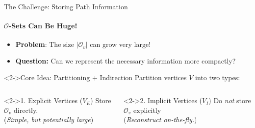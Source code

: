 \begin{frame}{The Challenge: Storing Path Information}
    \framesubtitle{$\mathcal{O}$-Sets Can Be Huge!}

    \begin{itemize}
        \item \textbf{Problem}: The size $|\mathcal{O}_v|$ can grow very large!
        \item \textbf{Question:} Can we represent the necessary information more compactly?
    \end{itemize}


    \begin{alertblock}<2->{Core Idea: Partitioning + Indirection}
        Partition vertices $V$ into two types:
    \end{alertblock}
    \vspace{-1em}
    \begin{columns}[T] %
        \begin{column}{0.48\textwidth}
            \begin{block}<2->{1. Explicit Vertices ($V_E$)}
                \centering
                Store $\mathcal{O}_v$ directly. \\
                (\textit{Simple, but potentially large})
            \end{block}
        \end{column}

        \begin{column}{0.48\textwidth}
            \begin{block}<2->{2. Implicit Vertices ($V_I$)}
                \centering
                Do \emph{not} store $\mathcal{O}_v$ explicitly \\
                (\textit{Reconstruct on-the-fly.})
            \end{block}
            \vspace{0.5em}
        \end{column}
    \end{columns}
\end{frame}



